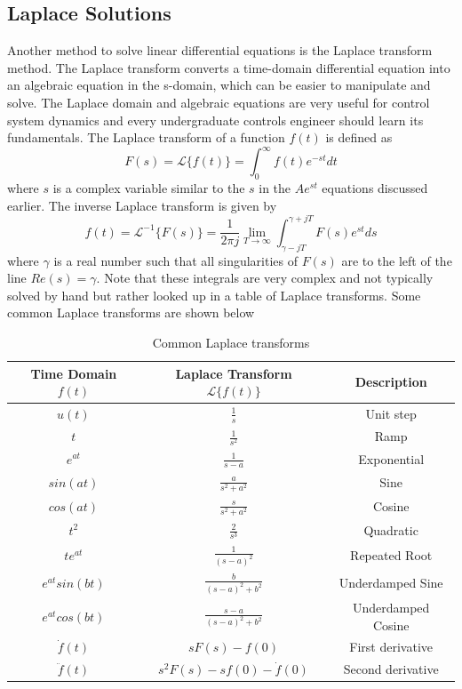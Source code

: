 \subsection{Laplace Solutions}

Another method to solve linear differential equations is the Laplace transform method. The Laplace transform converts a time-domain differential equation into an algebraic equation in the s-domain, which can be easier to manipulate and solve. The Laplace domain and algebraic equations are very useful for control system dynamics and every undergraduate controls engineer should learn its fundamentals. The Laplace transform of a function $f(t)$ is defined as 
\begin{equation}
    F(s) = \mathcal{L}\{f(t)\} = \int_0^{\infty} f(t) e^{-st} dt
\end{equation}
where $s$ is a complex variable similar to the $s$ in the $Ae^{st}$ equations discussed earlier. The inverse Laplace transform is given by 
\begin{equation}
    f(t) = \mathcal{L}^{-1}\{F(s)\} = \frac{1}{2\pi j} \lim_{T \to \infty} \int_{\gamma - jT}^{\gamma + jT} F(s) e^{st} ds
\end{equation}
where $\gamma$ is a real number such that all singularities of $F(s)$ are to the left of the line $Re(s) = \gamma$. Note that these integrals are very complex and not typically solved by hand but rather looked up in a table of Laplace transforms. Some common Laplace transforms are shown below
\renewcommand{\arraystretch}{1.5} %
\begin{table}[H]
\centering
\begin{tabular}{|c|c|c|}
\hline
Time Domain $f(t)$ & Laplace Transform $\mathcal{L}\{f(t)\}$ & Description \\
\hline
$u(t)$ & $\frac{1}{s}$ & Unit step \\
$t$ & $\frac{1}{s^2}$ & Ramp \\
$e^{at}$ & $\frac{1}{s-a}$ & Exponential \\
$sin(at)$ & $\frac{a}{s^2 + a^2}$ & Sine \\
$cos(at)$ & $\frac{s}{s^2 + a^2}$ & Cosine \\
$t^2$ & $\frac{2}{s^3}$ & Quadratic \\
$te^{at}$ & $\frac{1}{(s-a)^2}$ & Repeated Root \\
$e^{at}sin(bt)$ & $\frac{b}{(s-a)^2 + b^2}$ & Underdamped Sine \\
$e^{at}cos(bt)$ & $\frac{s-a}{(s-a)^2 + b^2}$ & Underdamped Cosine \\
$\dot{f}(t)$ & $sF(s) - f(0)$ & First derivative \\
$\ddot{f}(t)$ & $s^2F(s) - sf(0) - \dot{f}(0)$ & Second derivative \\
\hline
\end{tabular}
\caption{Common Laplace transforms}
\end{table}
